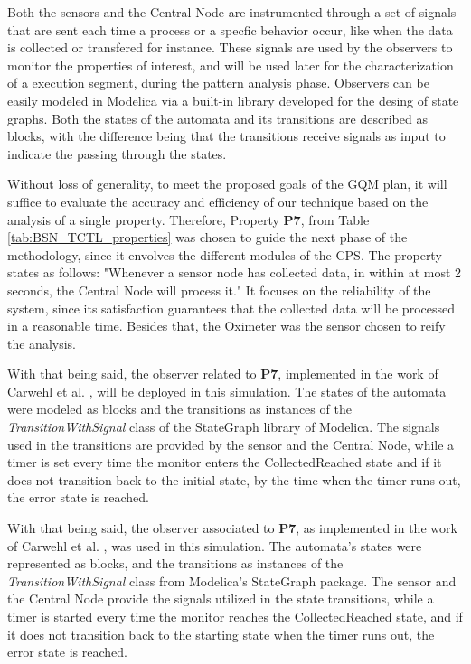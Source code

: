Both the sensors and the Central Node are instrumented through a set of signals that are sent each time a process or a specfic behavior occur, like when the data is collected or transfered for instance. These signals are used by the observers to monitor the properties of interest, and will be used later for the characterization of a execution segment, during the pattern analysis phase. Observers can be easily modeled in Modelica via a built-in library developed for the desing of state graphs. Both the states of the automata and its transitions are described as blocks, with the difference being that the transitions receive signals as input to indicate the passing through the states. 

Without loss of generality, to meet the proposed goals of the GQM plan, it will suffice to evaluate the accuracy and efficiency of our technique based on the analysis of a single property. Therefore, Property \textbf{P7}, from Table \ref{tab:BSN_TCTL_properties} was chosen to guide the next phase of the methodology, since it envolves the different modules of the CPS. The property states as follows: "Whenever a sensor node has collected data, in within at most 2 seconds, the Central Node will process it." It focuses on the reliability of the system, since its satisfaction guarantees that the collected data will be processed in a reasonable time. Besides that, the Oximeter was the sensor chosen to reify the analysis. 

With that being said, the observer related to \textbf{P7}, implemented in the work of Carwehl et al. \cite{2022PSP}, will be deployed in this simulation. The states of the automata were modeled as blocks and the transitions as instances of the \textit{TransitionWithSignal} class of the StateGraph library of Modelica. The signals used in the transitions are provided by the sensor and the Central Node, while a timer is set every time the monitor enters the CollectedReached state  and if it does not transition back to the initial state, by the time when the timer runs out, the error state is reached. 

With that being said, the observer associated to \textbf{P7}, as implemented in the work of Carwehl et al. \cite{2022PSP}, was used in this simulation. The automata's states were represented as blocks, and the transitions as instances of the \textit{TransitionWithSignal} class from Modelica's StateGraph package. The sensor and the Central Node provide the signals utilized in the state transitions, while a timer is started every time the monitor reaches the CollectedReached state, and if it does not transition back to the starting state when the timer runs out, the error state is reached.


